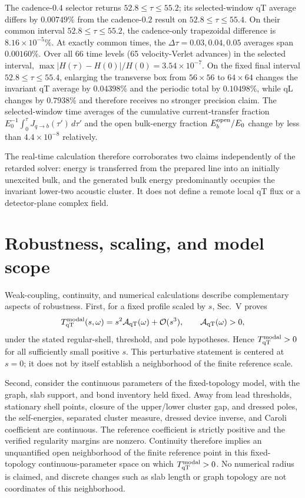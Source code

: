 \documentclass[10pt,aps,pre,reprint,floatfix,notitlepage,nofootinbib]{revtex4-2}
\newcommand{\order}{\mathcal O}
\newcommand{\qT}{\mathrm{qT}}
\begin{document}
The cadence-$0.4$ selector returns $52.8\leq\tau\leq55.2$; its selected-window qT average differs by $0.00749\%$ from the cadence-$0.2$ result on $52.8\leq\tau\leq55.4$. On their common interval $52.8\leq\tau\leq55.2$, the cadence-only trapezoidal difference is $8.16\times10^{-5}\%$.  At exactly common times, the $\Delta\tau=0.03,0.04,0.05$ averages span $0.00160\%$.  Over all 66 time levels (65 velocity-Verlet advances) in the selected interval, $\max |H(\tau)-H(0)|/H(0)=3.54\times10^{-7}$.  On the fixed final interval $52.8\leq\tau\leq55.4$, enlarging the transverse box from $56\times56$ to $64\times64$ changes the invariant qT average by $0.04398\%$ and the periodic total by $0.10498\%$, while qL changes by $0.7938\%$ and therefore receives no stronger precision claim. The selected-window time averages of the cumulative current-transfer fraction $E_0^{-1}\int_0^\tau J_{q\to b}(\tau')\,d\tau'$ and the open bulk-energy fraction $E_b^{\rm open}/E_0$ change by less than $4.4\times10^{-8}$ relatively.

The real-time calculation therefore corroborates two claims independently of the retarded solver: energy is transferred from the prepared line into an initially unexcited bulk, and the generated bulk energy predominantly occupies the invariant lower-two acoustic cluster.  It does not define a remote local $\qT$ flux or a detector-plane complex field.

\section{Robustness, scaling, and model scope}
\label{sec:s9-robustness}

Weak-coupling, continuity, and numerical calculations describe complementary aspects of robustness. First, for a fixed profile scaled by $s$, Sec.~V proves
\begin{equation}
T_{\qT}^{\rm modal}(s,\omega)
=s^2\mathcal A_{\qT}(\omega)+\order(s^3),
\qquad \mathcal A_{\qT}(\omega)>0,
\label{eq:s9-weak-neighborhood}
\end{equation}
under the stated regular-shell, threshold, and pole hypotheses. Hence $T_{\qT}^{\rm modal}>0$ for all sufficiently small positive $s$. This perturbative statement is centered at $s=0$; it does not by itself establish a neighborhood of the finite reference scale.

Second, consider the continuous parameters of the fixed-topology model, with the graph, slab support, and bond inventory held fixed. Away from lead thresholds, stationary shell points, closure of the upper/lower cluster gap, and dressed poles, the self-energies, separated cluster measure, dressed device inverse, and Caroli coefficient are continuous. The reference coefficient is strictly positive and the verified regularity margins are nonzero. Continuity therefore implies an unquantified open neighborhood of the finite reference point in this fixed-topology continuous-parameter space on which $T_{\qT}^{\rm modal}>0$. No numerical radius is claimed, and discrete changes such as slab length or graph topology are not coordinates of this neighborhood.
\end{document}

